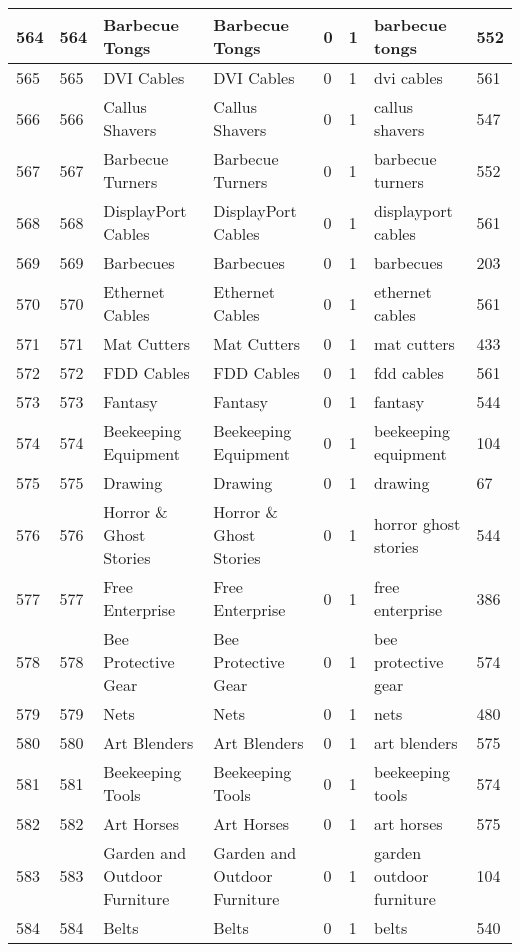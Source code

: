 \begin{longtable}{|l|l|l|l|l|l|l|l|}
564 & 564 & Barbecue Tongs & Barbecue Tongs & 0 & 1 & barbecue tongs & 552 \\ \hline 
565 & 565 & DVI Cables & DVI Cables & 0 & 1 & dvi cables & 561 \\ \hline 
566 & 566 & Callus Shavers & Callus Shavers & 0 & 1 & callus shavers & 547 \\ \hline 
567 & 567 & Barbecue Turners & Barbecue Turners & 0 & 1 & barbecue turners & 552 \\ \hline 
568 & 568 & DisplayPort Cables & DisplayPort Cables & 0 & 1 & displayport cables & 561 \\ \hline 
569 & 569 & Barbecues & Barbecues & 0 & 1 & barbecues & 203 \\ \hline 
570 & 570 & Ethernet Cables & Ethernet Cables & 0 & 1 & ethernet cables & 561 \\ \hline 
571 & 571 & Mat Cutters & Mat Cutters & 0 & 1 & mat cutters & 433 \\ \hline 
572 & 572 & FDD Cables & FDD Cables & 0 & 1 & fdd cables & 561 \\ \hline 
573 & 573 & Fantasy & Fantasy & 0 & 1 & fantasy & 544 \\ \hline 
574 & 574 & Beekeeping Equipment & Beekeeping Equipment & 0 & 1 & beekeeping equipment & 104 \\ \hline 
575 & 575 & Drawing & Drawing & 0 & 1 & drawing & 67 \\ \hline 
576 & 576 & Horror \& Ghost Stories & Horror \& Ghost Stories & 0 & 1 & horror ghost stories & 544 \\ \hline 
577 & 577 & Free Enterprise & Free Enterprise & 0 & 1 & free enterprise & 386 \\ \hline 
578 & 578 & Bee Protective Gear & Bee Protective Gear & 0 & 1 & bee protective gear & 574 \\ \hline 
579 & 579 & Nets & Nets & 0 & 1 & nets & 480 \\ \hline 
580 & 580 & Art Blenders & Art Blenders & 0 & 1 & art blenders & 575 \\ \hline 
581 & 581 & Beekeeping Tools & Beekeeping Tools & 0 & 1 & beekeeping tools & 574 \\ \hline 
582 & 582 & Art Horses & Art Horses & 0 & 1 & art horses & 575 \\ \hline 
583 & 583 & Garden and Outdoor Furniture & Garden and Outdoor Furniture & 0 & 1 & garden outdoor furniture & 104 \\ \hline 
584 & 584 & Belts & Belts & 0 & 1 & belts & 540 \\ \hline 

\end{longtable}
